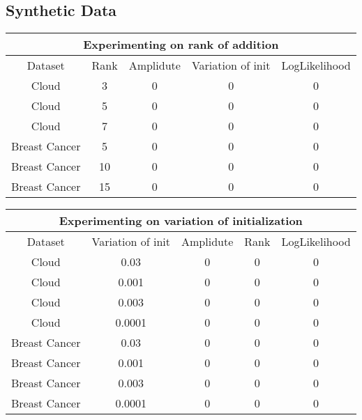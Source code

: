 \documentclass[a4paper]{article}
\begin{document}
\subsection{Synthetic Data}

\begin{center}
    \begin{tabular}{||c c c c c||} 
     \hline
     \multicolumn{5}{|c|}{Experimenting on rank of addition} \\
     \hline
     Dataset & Rank & Amplidute & Variation of init & LogLikelihood \\ [0.5ex] 
     \hline\hline
     Cloud & 3 & 0 & 0 & 0\\ 
     \hline
     Cloud & 5 & 0 & 0 & 0\\
     \hline
     Cloud & 7 & 0 & 0 & 0\\
     \hline
     Breast Cancer & 5 & 0 & 0 & 0\\
     \hline
     Breast Cancer & 10 & 0 & 0 & 0\\
     \hline
     Breast Cancer & 15 & 0 & 0 & 0\\ [1ex] 
     \hline
    \end{tabular}
\end{center}

\begin{center}
    \begin{tabular}{||c c c c c||} 
     \hline
     \multicolumn{5}{|c|}{Experimenting on variation of initialization} \\
     \hline
     Dataset & Variation of init & Amplidute & Rank & LogLikelihood \\ [0.5ex] 
     \hline\hline
     Cloud & 0.03 & 0 & 0 & 0 \\
     \hline
     Cloud & 0.001 & 0 & 0 & 0 \\ 
     \hline
     Cloud & 0.003 & 0 & 0 & 0 \\ 
     \hline
     Cloud & 0.0001 & 0 & 0 & 0 \\ 
     \hline
     Breast Cancer & 0.03 & 0 & 0 & 0 \\
     \hline
     Breast Cancer & 0.001 & 0 & 0 & 0 \\ 
     \hline
     Breast Cancer & 0.003 & 0 & 0 & 0 \\ 
     \hline
     Breast Cancer & 0.0001 & 0 & 0 & 0 \\[1ex] 
     \hline
    \end{tabular}
\end{center}
\end{document}
